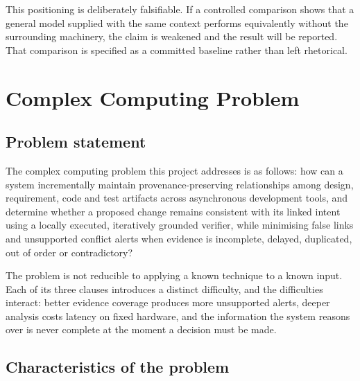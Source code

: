 This positioning is deliberately falsifiable. If a controlled comparison shows
that a general model supplied with the same context performs equivalently
without the surrounding machinery, the claim is weakened and the result will be
reported. That comparison is specified as a committed baseline rather than left
rhetorical.

\section{Complex Computing Problem}

\subsection{Problem statement}

The complex computing problem this project addresses is as follows: how can a
system incrementally maintain provenance-preserving relationships among design,
requirement, code and test artifacts across asynchronous development tools, and
determine whether a proposed change remains consistent with its linked intent
using a locally executed, iteratively grounded verifier, while minimising false
links and unsupported conflict alerts when evidence is incomplete, delayed,
duplicated, out of order or contradictory?

The problem is not reducible to applying a known technique to a known input.
Each of its three clauses introduces a distinct difficulty, and the difficulties
interact: better evidence coverage produces more unsupported alerts, deeper
analysis costs latency on fixed hardware, and the information the system reasons
over is never complete at the moment a decision must be made.

\subsection{Characteristics of the problem}

